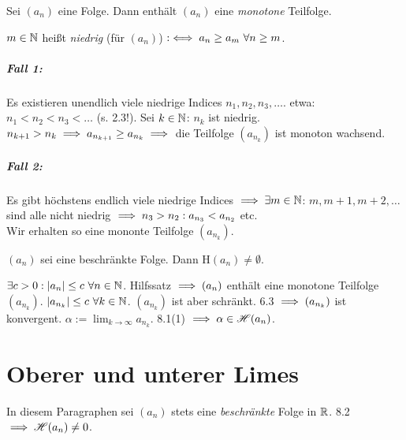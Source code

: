 \documentclass[a4paper,twoside,DIV15,BCOR12mm]{scrbook}
\begin{document}
\begin{hilfssatz}
Sei $(a_n)$ eine Folge. Dann enthält $(a_n)$ eine \textit{monotone} Teilfolge.
\end{hilfssatz}

\begin{beweis}
$m\in\mathbb{N}$ heißt \textit{niedrig} (für $(a_n)$) $:\iff a_n \ge a_m \ \forall n\ge m$.
\paragraph{Fall 1:} Es existieren unendlich viele niedrige Indices $n_1,n_2,n_3,\ldots$. etwa: $n_1 < n_2 < n_3 < \ldots$ (s. 2.3!). Sei $k\in\mathbb{N}$: $n_k$ ist niedrig. $n_{k+1} > n_k \implies a_{n_{k+1}} \ge a_{n_k} \implies$ die Teilfolge $(a_{n_k})$ ist monoton wachsend.
\paragraph{Fall 2:} Es gibt höchstens endlich viele niedrige Indices $\implies \exists m\in\mathbb{N}$: $m, m+1, m+2,\ldots$ sind alle nicht niedrig $\implies n_3>n_2: a_{n_3} < a_{n_2}$ etc. \\
Wir erhalten so eine mononte Teilfolge $(a_{n_k})$.
\end{beweis}

\begin{satz}
$(a_n)$ sei eine beschränkte Folge. Dann H$(a_n) \ne \emptyset$.
\end{satz}

\begin{beweis}
$\exists c>0: |a_n| \le c \ \forall n\in\mathbb{N}$. Hilfssatz $\implies (a_n)$ enthält eine monotone Teilfolge $(a_{n_k})$. $|a_{n_k}| \le c \ \forall k \in\mathbb{N}$. $(a_{n_k})$ ist aber schränkt. 6.3 $\implies (a_{n_k})$ ist konvergent. $\alpha := \lim_{k\to\infty}a_{n_k}$. 8.1(1) $\implies \alpha \in \mathscr{H}(a_n)$. 
\end{beweis}

\chapter{Oberer und unterer Limes}

\begin{vereinbarung}
In diesem Paragraphen sei $(a_n)$ stets eine \textit{beschränkte} Folge in $\mathbb{R}$. 8.2 $\implies \mathscr{H}(a_n) \ne 0$.
\end{vereinbarung}
\end{document}
